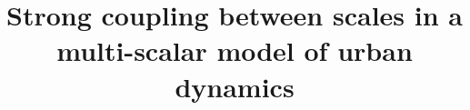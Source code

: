\documentclass[referee,lineno,pdflatex,sn-apa]{sn-jnl}
\begin{document}
\title[Multi-scalar urban dynamics model]{Strong coupling between scales in a multi-scalar model of urban dynamics}

\author{}










\end{document}
